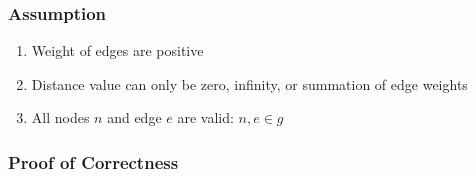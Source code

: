 \documentclass[11pt, a4paper]{article} %
\theoremstyle{definition}
\begin{document}
\subsubsection{Assumption}
\begin{enumerate}
  \item Weight of edges are positive
  \item Distance value can only be zero, infinity, or summation of edge weights
  \item All nodes $n$ and edge $e$ are valid: $n, e \in g$
\end{enumerate}

\subsubsection{Proof of Correctness}
\end{document}
